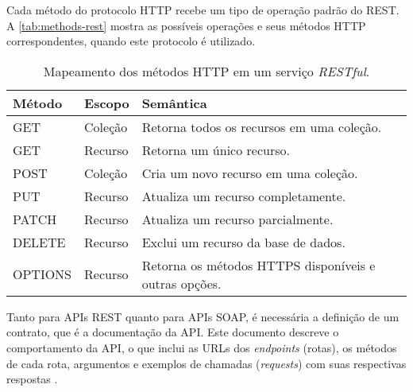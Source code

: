 Cada método do protocolo HTTP recebe um tipo de operação padrão do REST. A \autoref{tab:methods-rest} mostra as possíveis operações e seus métodos HTTP correspondentes, quando este protocolo é utilizado.

\begin{table}[htb]
	\centering
	\caption{Mapeamento dos métodos HTTP em um serviço \textit{RESTful}.}
	\begin{tabular}{p{2cm}p{2cm}p{9cm}}
		\hline
		\textbf{Método} &
		\textbf{Escopo} &
		\textbf{Semântica}                                    \\[5mm]

		\hline
		GET             &
		Coleção         &
		Retorna todos os recursos em uma coleção.             \\[5mm]

		\hline
		GET             &
		Recurso         &
		Retorna um único recurso.                             \\[5mm]

		\hline
		POST            &
		Coleção         &
		Cria um novo recurso em uma coleção.                  \\[5mm]

		\hline
		PUT             &
		Recurso         &
		Atualiza um recurso completamente.                    \\[5mm]

		\hline
		PATCH           &
		Recurso         &
		Atualiza um recurso parcialmente.                     \\[5mm]

		\hline
		DELETE          &
		Recurso         &
		Exclui um recurso da base de dados.                   \\[5mm]

		\hline
		OPTIONS         &
		Recurso         &
		Retorna os métodos HTTPS disponíveis e outras opções. \\[5mm]

		\hline
	\end{tabular}
	\label{tab:methods-rest}
\end{table}

Tanto para APIs REST quanto para APIs SOAP, é necessária a definição de um contrato, que é a documentação da API. Este documento descreve o comportamento da API, o que inclui as URLs dos \textit{endpoints} (rotas), os métodos de cada rota, argumentos e exemplos de chamadas (\textit{requests}) com suas respectivas respostas \cite{santos2020apicontract}.

